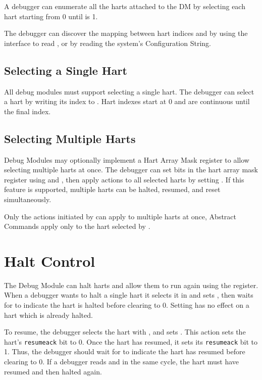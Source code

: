 A debugger can enumerate all the harts
attached to the DM by selecting each hart starting from 0
until \Fanynonexistent is 1.

The debugger can discover the mapping between hart indices and
\Rmhartid by using the interface to read \Rmhartid, or by
reading the system's Configuration String.

\subsection {Selecting a Single Hart}

All debug modules must support selecting a single hart.
The debugger can select a hart by writing its index to \Fhartsel.
Hart indexes start at 0 and are continuous until the final index.

\subsection {Selecting Multiple Harts}

Debug Modules may optionally implement a Hart Array Mask register to allow
selecting multiple harts at once. The debugger can set bits in the hart array mask register
using \Rhawindowsel and \Rhawindow, then apply actions to all selected harts
by setting \Fhasel. If this feature is supported, multiple harts can be
halted, resumed, and reset simultaneously.

Only the actions initiated by \Rdmcontrol can apply to multiple harts
at once, Abstract Commands apply only to the hart selected by
\Fhartsel.

\section{Halt Control} \label{haltcontrol}

The Debug Module can halt harts and allow them to run again using
the \Rdmcontrol register.
When a debugger wants to halt a single hart it selects it in \Fhartsel
and sets \Fhaltreq, then waits
for \Fallhalted to indicate the hart is halted before clearing \Fhaltreq
to 0. Setting \Fhaltreq has no effect on a hart which is already halted.

To resume, the debugger selects the hart with \Fhartsel,
and sets \Fresumereq. This action sets the hart's
{\tt resumeack} bit to 0. Once the hart has resumed, it
sets its {\tt resumeack} bit to 1. Thus, the
debugger should wait for \Fallresumeack to indicate the
hart has resumed before clearing \Fresumereq to 0.
If a debugger reads \Fallresumeack
and \Fallhalted in the same cycle, the hart must have resumed
and then halted again.

